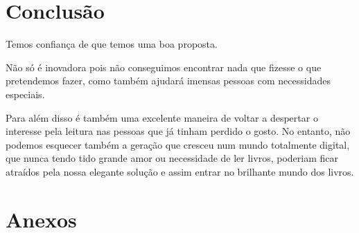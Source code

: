\documentclass[11pt]{article}
\begin{document}
	
	\large
	\section{Conclusão}
	
	\normalsize
	Temos confiança de que temos uma boa proposta.
	
	Não só é inovadora pois não conseguimos encontrar nada que fizesse o que pretendemos fazer, como também ajudará imensas pessoas com necessidades especiais.
	
	Para além disso é também uma excelente maneira de voltar a despertar o interesse pela leitura nas pessoas que já tinham perdido o gosto. No entanto, não podemos esquecer também a geração que cresceu num mundo totalmente digital, que nunca tendo tido grande amor ou necessidade de ler livros, poderiam ficar atraídos pela nossa elegante solução e assim entrar no brilhante mundo dos livros.
	
	
	\pagebreak
	
	\large
	\section{Anexos}

	\normalsize
	\listoffigures
\end{document}
